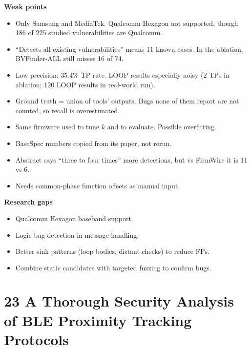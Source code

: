 \documentclass[11pt,a4paper]{article}
\begin{document}
\begin{enumerate}
    \vspace{4pt}
    \textbf{Weak points}
    \begin{itemize}
        \item Only Samsung and MediaTek. Qualcomm Hexagon not supported, though 186 of 225 studied vulnerabilities are Qualcomm.
        \item ``Detects all existing vulnerabilities'' means 11 known cases. In the ablation, BVFinder-ALL still misses 16 of 74.
        \item Low precision: 35.4\% TP rate. LOOP results especially noisy (2 TPs in ablation; 120 LOOP results in real-world run).
        \item Ground truth = union of tools' outputs. Bugs none of them report are not counted, so recall is overestimated.
        \item Same firmware used to tune $k$ and to evaluate. Possible overfitting.
        \item BaseSpec numbers copied from its paper, not rerun.
        \item Abstract says ``three to four times'' more detections, but vs FirmWire it is 11 vs 6.
        \item Needs common-phase function offsets as manual input.
    \end{itemize}

    \vspace{4pt}
    \textbf{Research gaps}
    \begin{itemize}
        \item Qualcomm Hexagon baseband support.
        \item Logic bug detection in message handling.
        \item Better sink patterns (loop bodies, distant checks) to reduce FPs.
        \item Combine static candidates with targeted fuzzing to confirm bugs.
    \end{itemize}

\end{enumerate}

\newpage

\section{23 A Thorough Security Analysis of BLE Proximity Tracking Protocols}
\end{document}
